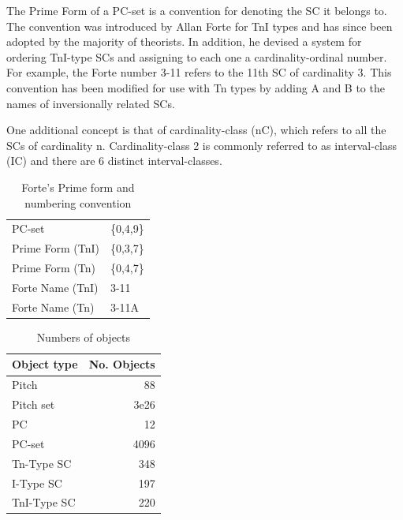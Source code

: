 \documentclass{article}
\begin{document}
The Prime Form of a PC-set is a convention for denoting the SC it
belongs to. The convention was introduced by Allan Forte
\citep{Forte1973} for TnI types and has since been adopted by the
majority of theorists. In addition, he devised a system for ordering
TnI-type SCs and assigning to each one a cardinality-ordinal
number. For example, the Forte number 3-11 refers to the 11th SC of
cardinality 3. This convention has been modified for use with Tn types
by adding A and B to the names of inversionally related SCs.

One additional concept is that of cardinality-class (nC), which refers
to all the SCs of cardinality n. Cardinality-class 2 is commonly
referred to as interval-class (IC) and there are 6 distinct
interval-classes.
\begin{table}[htb]
\caption{Forte's Prime form and numbering convention} 
\begin{center}
\begin{tabular}{ll}
 PC-set            &  \{0,4,9\}  \\
 Prime Form (TnI)  &  \{0,3,7\}  \\
 Prime Form (Tn)   &  \{0,4,7\}  \\
 Forte Name (TnI)  &  3-11       \\
 Forte Name (Tn)   &  3-11A      \\
\end{tabular}
\end{center}
\end{table}


\begin{table}[htb]
\caption{Numbers of objects} 
\begin{center}
\begin{tabular}{lr}
 Object type  &  No. Objects  \\
\hline
 Pitch        &           88  \\
 Pitch set    &         3e26  \\
 PC           &           12  \\
 PC-set       &         4096  \\
 Tn-Type SC   &          348  \\
 I-Type SC    &          197  \\
 TnI-Type SC  &          220  \\
\end{tabular}
\end{center}
\end{table}
\end{document}
